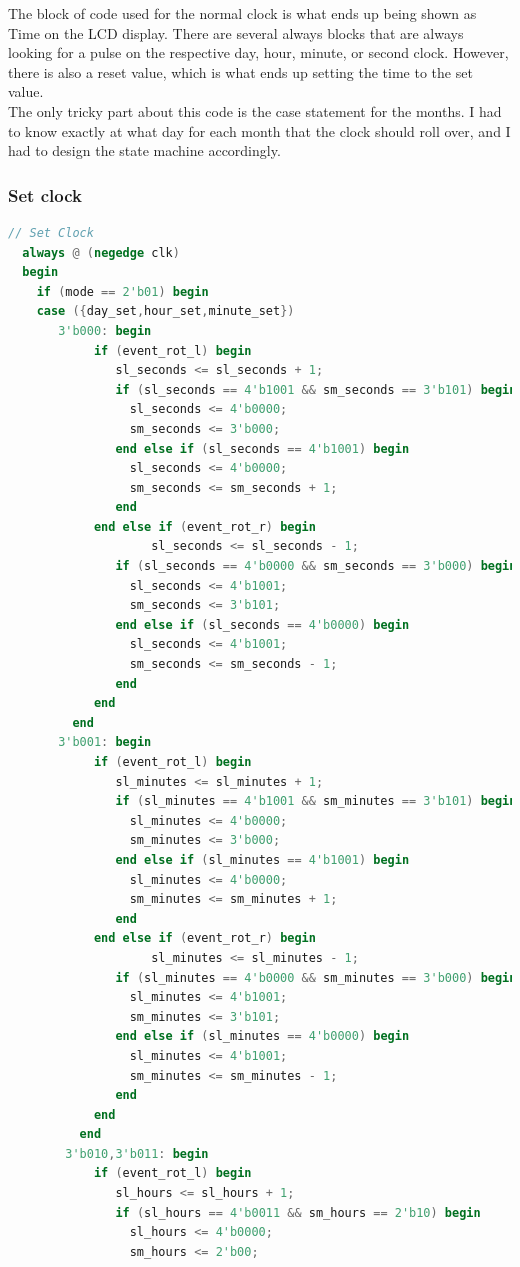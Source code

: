 \documentclass[12pt,a4paper,hidelinks]{article}            %
\begin{document}
The block of code used for the normal clock is what ends up being shown as Time on the LCD display. There are several always blocks that are always looking for a pulse on the respective day, hour, minute, or second clock. However, there is also a reset value, which is what ends up setting the time to the set value.\\
The only tricky part about this code is the case statement for the months. I had to know exactly at what day for each month that the clock should roll over, and I had to design the state machine accordingly.

\subsubsection{Set clock}

\begin{lstlisting}[language=Verilog,firstnumber=216]
// Set Clock
  always @ (negedge clk)
  begin
    if (mode == 2'b01) begin
    case ({day_set,hour_set,minute_set})
       3'b000: begin
		    if (event_rot_l) begin
			   sl_seconds <= sl_seconds + 1;
 			   if (sl_seconds == 4'b1001 && sm_seconds == 3'b101) begin
			     sl_seconds <= 4'b0000;
			     sm_seconds <= 3'b000;
			   end else if (sl_seconds == 4'b1001) begin
			     sl_seconds <= 4'b0000;
			     sm_seconds <= sm_seconds + 1;
			   end
		    end else if (event_rot_r) begin
				    sl_seconds <= sl_seconds - 1;
			   if (sl_seconds == 4'b0000 && sm_seconds == 3'b000) begin
			     sl_seconds <= 4'b1001;
			     sm_seconds <= 3'b101;
			   end else if (sl_seconds == 4'b0000) begin
			     sl_seconds <= 4'b1001;
			     sm_seconds <= sm_seconds - 1;
			   end
		    end
	     end
	   3'b001: begin
		    if (event_rot_l) begin
			   sl_minutes <= sl_minutes + 1;
 			   if (sl_minutes == 4'b1001 && sm_minutes == 3'b101) begin
			     sl_minutes <= 4'b0000;
			     sm_minutes <= 3'b000;
			   end else if (sl_minutes == 4'b1001) begin
			     sl_minutes <= 4'b0000;
			     sm_minutes <= sm_minutes + 1;
			   end
		    end else if (event_rot_r) begin
				    sl_minutes <= sl_minutes - 1;
			   if (sl_minutes == 4'b0000 && sm_minutes == 3'b000) begin
			     sl_minutes <= 4'b1001;
			     sm_minutes <= 3'b101;
			   end else if (sl_minutes == 4'b0000) begin
			     sl_minutes <= 4'b1001;
			     sm_minutes <= sm_minutes - 1;
			   end
		    end
		  end
		3'b010,3'b011: begin
		    if (event_rot_l) begin
			   sl_hours <= sl_hours + 1;
 			   if (sl_hours == 4'b0011 && sm_hours == 2'b10) begin
			     sl_hours <= 4'b0000;
			     sm_hours <= 2'b00;

\end{lstlisting}
\end{document}
